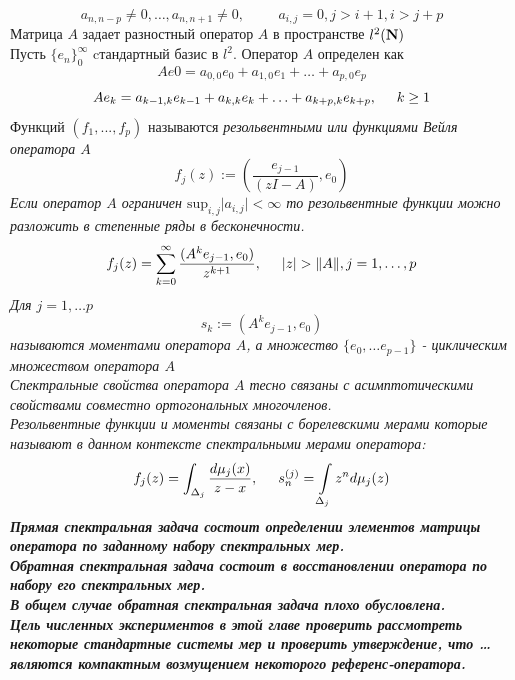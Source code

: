 \documentclass[12pt, a4paper]{report}
\begin{document}
$$a_{n,n-p}\not=0,\ldots,a_{n,n+1}\not=0, \hspace{1cm} a_{i,j}=0, j>i+1,i>j+p $$
Матрица $A$ задает разностный оператор $A$ в пространстве $l^2 (\sf \bf N \rm)$ \\
Пусть $\{ e_n \}_{0}^{\infty}$ cтандартный базис в $l^2$.   
Оператор $A$ определен как
$$
Ae0=a_{0,0}e_0+ a_{1,0}e_1 + \ldots + a_{p,0}e_p
$$
$$
Ae_k=a_{k-1,k}e_{k-1}+a_{k,k}e_{k}+\ldots+a_{k+p,k}e_{k+p}, \hspace {0.5cm} k\geq 1
$$
Функций $(f_1, ... , f_p)$ называются \it резольвентными \rm или \it функциями Вейля \rm оператора $A$ 
$$
f_j(z) := \left(\frac {e_{j-1}} {(zI - A)}, e_0 \right)
$$
Если оператор $A$ ограничен $\mbox{sup}_{i,j} \vert a_{i,j} \vert < \infty $ то резольвентные функции можно разложить в степенные ряды в бесконечности.
$$
f_j(z) = \sum\limits_{k=0}^{\infty}{\frac{(A^k e_{j-1}, e_0)}{z^{k+1}}}, \hspace{0.5cm} \vert z \vert > \Vert A \Vert, j=1,\ldots,p
$$
Для $j=1,\ldots p$ 
$$
s_k :=(A^k e_{j-1}, e_0)
$$ 
называются \it моментами \rm оператора $A$, а множество $\{e_0, \ldots e_{p-1}\}$ - \it циклическим множеством \rm оператора $A$ \\
Спектральные свойства оператора $A$ тесно связаны с асимптотическими свойствами совместно ортогональных многочленов. \\
Резольвентные функции и моменты связаны с борелевскими мерами которые называют в данном контексте \it спектральными мерами \rm оператора:
$$
f_j(z) = \int _{\Delta_j} \frac{d\mu_j(x)}{z-x}, \hspace{0.5cm} s_n^{(j)}=\int \limits_{\Delta_j} {z^n d\mu_j (z)}
$$
\bf Прямая спектральная задача \rm состоит определении элементов матрицы оператора по заданному набору спектральных мер. \\
\bf Обратная спектральная задача \rm состоит в восстановлении оператора по набору его спектральных мер. \\
В общем случае обратная спектральная задача плохо обусловлена. \\
Цель численных экспериментов в этой главе проверить рассмотреть некоторые стандартные системы мер и проверить утверждение, что \ldots являются \it компактным возмущением \rm некоторого референс-оператора.

\newpage 
\end{document}
